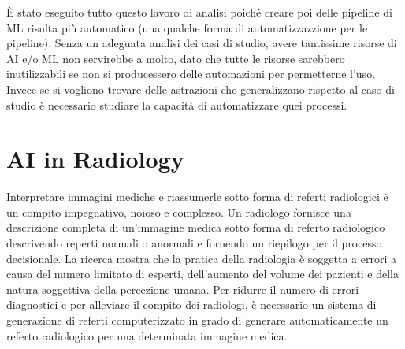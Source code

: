 \documentclass[12pt,a4paper]{report}
\begin{document}
È stato eseguito tutto questo lavoro di analisi poiché creare poi delle pipeline di ML risulta più automatico (una qualche forma di automatizzazzione per le pipeline). Senza un adeguata analisi dei casi di studio, avere tantissime risorse di AI e/o ML non servirebbe a molto, dato che tutte le risorse sarebbero inutilizzabili se non si producessero delle automazioni per permetterne l'uso. Invece se si vogliono trovare delle astrazioni che generalizzano rispetto al caso di studio è necessario studiare la capacità di automatizzare quei processi.\\

\chapter{AI in Radiology}
Interpretare immagini mediche e riassumerle sotto forma di referti radiologici è un compito impegnativo, noioso e complesso. Un radiologo fornisce una descrizione completa di un'immagine medica sotto forma di referto radiologico descrivendo reperti normali o anormali e fornendo un riepilogo per il processo decisionale. La ricerca mostra che la pratica della radiologia è soggetta a errori a causa del numero limitato di esperti, dell'aumento del volume dei pazienti e della natura soggettiva della percezione umana. Per ridurre il numero di errori diagnostici e per alleviare il compito dei radiologi, è necessario un sistema di generazione di referti computerizzato in grado di generare automaticamente un referto radiologico per una determinata immagine medica.
\end{document}
